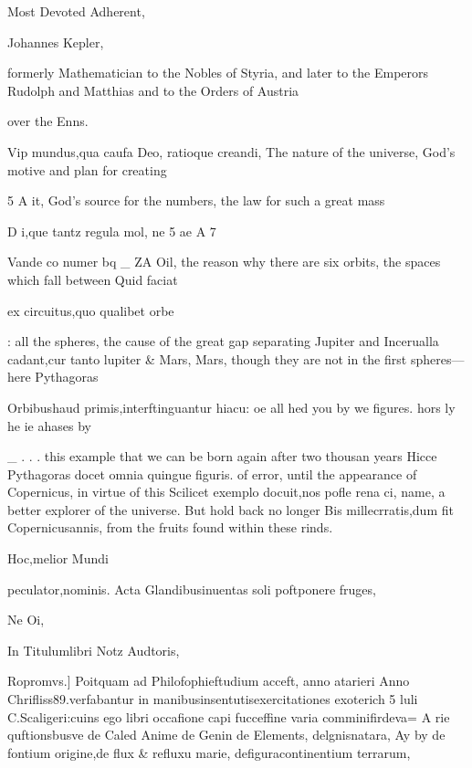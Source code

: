 \documentclass{article}
\begin{document}
{{Most Devoted Adherent,

Johannes Kepler,

formerly Mathematician to the Nobles of Styria,
and later to the Emperors Rudolph and Matthias
and to the Orders of Austria

over the Enns.


Vip mundus,qua caufa Deo, ratioque creandi, The nature of the universe, God’s motive and plan for creating

5 A it, God’s source for the numbers, the law for such a great mass

D i,que tantz regula mol, ne 5 ae A 7

Vande co numer bq _ ZA Oil, the reason why there are six orbits, the spaces which fall between
Quid faciat {ex circuitus,quo qualibet orbe

: all the spheres, the cause of the great gap separating Jupiter and
Incerualla cadant,cur tanto lupiter & Mars, Mars, though they are not in the first spheres—here Pythagoras

Orbibushaud primis,interftinguantur hiacu: oe all hed you by we figures. hors ly he ie ahases by

_ . . . this example that we can be born again after two thousan years
Hicce Pythagoras docet omnia quingue figuris. of error, until the appearance of Copernicus, in virtue of this
Scilicet exemplo docuit,nos pofle rena ci, name, a better explorer of the universe. But hold back no longer
Bis millecrratis,dum fit Copernicusannis, from the fruits found within these rinds.

Hoc,melior Mundi {peculator,nominis. Acta
Glandibusinuentas soli poftponere fruges,





Ne Oi,


In Titulumlibri Notz Audtoris,

Ropromvs.] Poitquam ad Philofophieftudium acceft, anno atarieri
Anno Chrifliss89.verfabantur in manibusinsentutisexercitationes exoterich
5 luli C.Scaligeri:cuins ego libri occafione capi fucceffine varia comminifirdeva=
A rie quftionsbusve de Caled Anime de Genin de Elements, delgnisnatara,
Ay by de fontium origine,de flux & refluxu marie, defiguracontinentium terrarum,

}}}}
\end{document}
